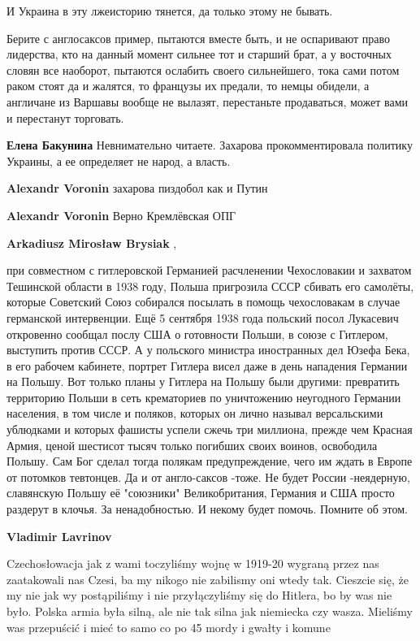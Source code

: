 \begin{itemize}
\begin{itemize}
И Украина в эту лжеисторию тянется, да только этому не бывать.

Берите с англосаксов пример, пытаются вместе быть, и не оспаривают право
лидерства, кто на данный момент сильнее тот и старший брат, а у восточных
словян все наоборот, пытаются ослабить своего сильнейшего, тока сами потом
раком стоят да и жалятся, то французы их предали, то немцы обидели, а англичане
из Варшавы вообще не вылазят, перестаньте продаваться, может вами и перестанут
торговать.

\textbf{Елена Бакунина} Невнимательно читаете. Захарова прокомментировала политику Украины, а ее определяет не народ, а власть.

\textbf{Alexandr Voronin} захарова пиздобол как и Путин

\textbf{Alexandr Voronin} Верно Кремлёвская ОПГ

\textbf{Arkadiusz Mirosław Brysiak} , 

при совместном с гитлеровской Германией расчленении Чехословакии и захватом
Тешинской области в 1938 году, Польша пригрозила СССР сбивать его самолёты,
которые Советский Союз собирался посылать в помощь чехословакам в случае
германской интервенции. Ещё 5 сентября 1938 года польский посол Лукасевич
откровенно сообщал послу США о готовности Польши, в союзе с Гитлером, выступить
против СССР. А у польского министра иностранных дел Юзефа Бека, в его рабочем
кабинете, портрет Гитлера висел даже в день нападения Германии на Польшу. Вот
только планы у Гитлера на Польшу были другими: превратить территорию Польши в
сеть крематориев по уничтожению неугодного Германии населения, в том числе и
поляков, которых он лично называл версальскими ублюдками и которых фашисты
успели сжечь три миллиона, прежде чем Красная Армия, ценой шестисот тысяч
только погибших своих воинов, освободила Польшу. Сам Бог сделал тогда полякам
предупреждение, чего им ждать в Европе от потомков тевтонцев. Да и от
англо-саксов -тоже. Не будет России -неядерную, славянскую Польшу её "союзники"
Великобритания, Германия и США просто раздерут в клочья. За ненадобностью. И
некому будет помочь. Помните об этом.

\textbf{Vladimir Lavrinov} 

Czechosłowacja jak z wami toczyliśmy wojnę w 1919-20 wygraną przez nas
zaatakowali nas Czesi, ba my nikogo nie zabilismy oni wtedy tak. Cieszcie się,
że my nie jak wy postąpiliśmy i nie przyłączyliśmy się do Hitlera, bo by was
nie było. Polska armia była silną, ale nie tak silna jak niemiecka czy wasza.
Mieliśmy was przepuścić i mieć to samo co po 45 mordy i gwałty i komune


\end{itemize}
\end{itemize}
